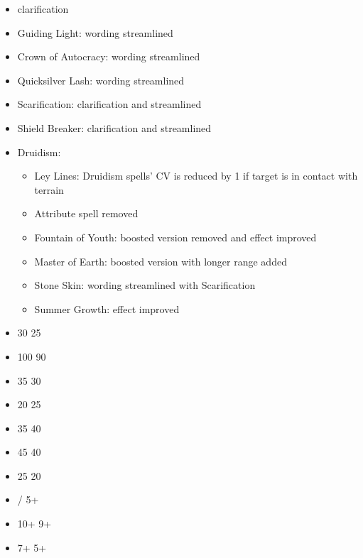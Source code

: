 
\clearpage
{}


\begin{itemize}
	\item \crownofautocracy{} clarification
\end{itemize}


\begin{itemize}
	\item Guiding Light: wording streamlined
	\item Crown of Autocracy: wording streamlined
	\item Quicksilver Lash: wording streamlined
	\item Scarification: clarification and streamlined
	\item Shield Breaker: clarification and streamlined
	\item Druidism:\begin{itemize}
		\item Ley Lines: Druidism spells' CV is reduced by 1 if target is in contact with terrain
		\item Attribute spell removed
		\item Fountain of Youth: boosted version removed and effect improved
		\item Master of Earth: boosted version with longer range added
		\item Stone Skin: wording streamlined with Scarification
		\item Summer Growth: effect improved
	\end{itemize}
\end{itemize}

\begin{itemize}
	\item \cleansinglight{} 30 \costdown{} 25
	\item \deathcheater{} 100 \costdown{} 90
	\item \ghostlyguard{} 35 \costdown{} 30
	\item \bannerofdiscipline{} 20 \costup{} 25
	\item \flamingstandard{} 35 \costup{} 40
	\item \crownofthewizardking{} 45 \costdown{} 40
	\item \dragonstaff{} 25 \costdown{} 20
\end{itemize}

\begin{itemize}
	\item \druidismspellone{}  /  \costdown{} 5+
	\item \druidismspellfive{} 10+ \costdown{} 9+
	\item \thaumaturgyspellthree{} 7+ \costdown{} 5+
\end{itemize}

